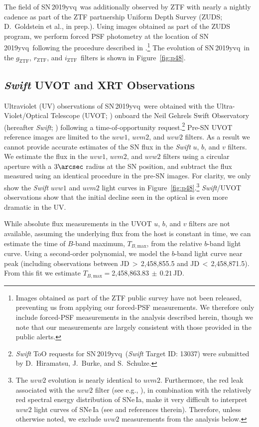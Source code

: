 \documentclass[twocolumn]{aastex63}
\newcommand{\rztf}{$r_\mathrm{ZTF}$}
\newcommand{\gztf}{$g_\mathrm{ZTF}$}
\newcommand{\iztf}{$i_\mathrm{ZTF}$}
\newcommand{\tbmax}{$T_{B,\mathrm{max}}$}
\newcommand{\sn}{SN\,2019yvq}
\begin{document}
The field of \sn\ was additionally observed by ZTF with nearly a nightly
cadence as part of the ZTF partnership Uniform Depth Survey (ZUDS;
D.~Goldstein et al., in prep.). Using images obtained as part of the ZUDS
program, we perform forced PSF photometry at the location of \sn\ following
the procedure described in \citet{Yao19}.\footnote{Images obtained as part of
the ZTF public survey have not been released, preventing us from applying our
forced-PSF measurements. We therefore only include forced-PSF measurements in
the analysis described herein, though we note that our measurements are
largely consistent with those provided in the public alerts.} The evolution
of \sn\ in the \gztf, \rztf, and \iztf\ filters is shown in
Figure~\ref{fig:p48}.

\subsection{\textit{Swift} UVOT and XRT Observations}\label{sec:swift}

Ultraviolet (UV) observations of \sn\ were obtained with the
Ultra-Violet/Optical Telescope (UVOT; \citealt{Roming05}) onboard the Neil
Gehrels Swift Observatory (hereafter \textit{Swift}; \citealt{Gehrels04})
following a time-of-opportunity request.\footnote{\textit{Swift} ToO requests
for \sn\ (\textit{Swift} Target ID: 13037) were submitted by
D.~Hiramatsu, J.~Burke, and S.~Schulze.} Pre-SN UVOT reference images are
limited to the $uvw1$, $uvm2$, and $uvw2$ filters. As a result we cannot
provide accurate estimates of the SN flux in the \textit{Swift} $u$, $b$, and
$v$ filters. We estimate the flux in the $uvw1$, $uvm2$, and $uvw2$ filters
using a circular aperture with a $3\arcsec$ radius at the SN position, and
subtract the flux measured using an identical procedure in the pre-SN images.
For clarity, we only show the \textit{Swift} $uvw1$ and $uvm2$ light curves in
Figure~\ref{fig:p48}.\footnote{The $uvw2$ evolution is nearly identical to
$uvm2$. Furthermore, the red leak associated with the $uvw2$ filter (see e.g.,
\citealt{Breeveld11}), in combination with the relatively red spectral energy
distribution of SNe\,Ia, make it very difficult to interpret $uvw2$ light
curves of SNe\,Ia (see \citealt{Brown17} and references therein). Therefore,
unless otherwise noted, we exclude $uvw2$ measurements from the analysis
below.} \textit{Swift}/UVOT observations show that the initial decline seen in
the optical is even more dramatic in the UV.

While absolute flux measurements in the UVOT $u$, $b$, and $v$ filters are not
available, assuming the underlying flux from the host is constant in time, we
can estimate the time of $B$-band maximum, \tbmax, from the relative $b$-band
light curve. Using a second-order polynomial, we model the $b$-band light
curve near peak (including observations between JD$\,> \,$2,458,855.5 and
JD$\,<\,$2,458,871.5). From this fit we estimate \tbmax$ = $2,458,863.83$
\,\pm \,0.21$\,JD.
\end{document}

